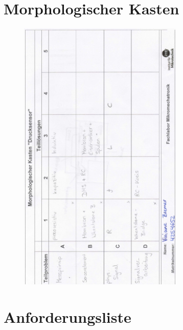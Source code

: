 \section{Morphologischer Kasten}
\label{sec:Anhang_1}

\begin{figure}[h]
	\centering
	\includegraphics[width=0.7\textwidth]{figures/MorphologischerKasten_Bremer.png}
\end{figure}

\newpage
\section{Anforderungsliste}
\label{sec:Anhang_2}

